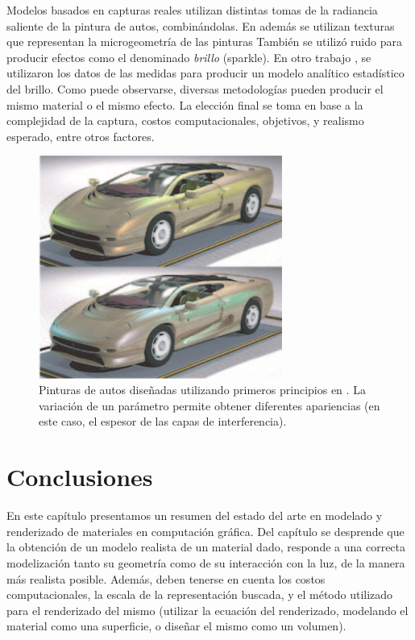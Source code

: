 Modelos basados en capturas reales utilizan distintas tomas de la radiancia saliente de la pintura de autos, combinándolas.
En \cite{Dumont2001} además se utilizan texturas que representan la microgeometría de las pinturas También se utilizó ruido para producir efectos como el denominado {\em brillo} (sparkle).
En otro trabajo \cite{Gunther2005}, se utilizaron los datos de las medidas para producir un modelo analítico estadístico del brillo.
Como puede observarse, diversas metodologías pueden producir el mismo material o el mismo efecto.
La elección final se toma en base a la complejidad de la captura, costos computacionales, objetivos, y realismo esperado, entre otros factores.

\begin{figure}
\center
\includegraphics[width=8cm]{figures/pinturaauto}
\caption[Pinturas de autos diseñadas utilizando primeros principios]{Pinturas de autos diseñadas utilizando primeros principios en \cite{Ershov2001}. La variación de un parámetro permite obtener diferentes apariencias (en este caso, el espesor de las capas de interferencia).}
\label{fg:pinturaauto}
\end{figure}


\section{Conclusiones}
En este capítulo presentamos un resumen del estado del arte en modelado y renderizado de materiales en computación gráfica.
Del capítulo se desprende que la obtención de un modelo realista de un material dado, responde a una correcta modelización tanto su geometría como de su interacción con la luz, de la manera más realista posible.
Además, deben tenerse en cuenta los costos computacionales, la escala de la representación buscada, y el método utilizado para el renderizado del mismo (utilizar la ecuación del renderizado, modelando el material como una superficie, o diseñar el mismo como un volumen).


